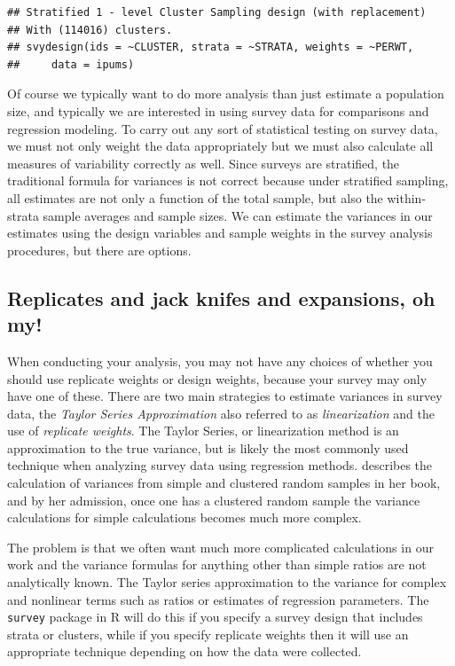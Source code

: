 \documentclass[
]{article}
\begin{document}
\begin{verbatim}
## Stratified 1 - level Cluster Sampling design (with replacement)
## With (114016) clusters.
## svydesign(ids = ~CLUSTER, strata = ~STRATA, weights = ~PERWT, 
##     data = ipums)
\end{verbatim}

Of course we typically want to do more analysis than just estimate a population size, and typically we are interested in using survey data for comparisons and regression modeling. To carry out any sort of statistical testing on survey data, we must not only weight the data appropriately but we must also calculate all measures of variability correctly as well. Since surveys are stratified, the traditional formula for variances is not correct because under stratified sampling, all estimates are not only a function of the total sample, but also the within-strata sample averages and sample sizes. We can estimate the variances in our estimates using the design variables and sample weights in the survey analysis procedures, but there are options.

\hypertarget{replicates-and-jack-knifes-and-expansions-oh-my}{%
\subsection{Replicates and jack knifes and expansions, oh my!}\label{replicates-and-jack-knifes-and-expansions-oh-my}}

When conducting your analysis, you may not have any choices of whether you should use replicate weights or design weights, because your survey may only have one of these. There are two main strategies to estimate variances in survey data, the \emph{Taylor Series Approximation} also referred to as \emph{linearization} and the use of \emph{replicate weights}. The Taylor Series, or linearization method is an approximation to the true variance, but is likely the most commonly used technique when analyzing survey data using regression methods. \citet{Lohr2019} describes the calculation of variances from simple and clustered random samples in her book, and by her admission, once one has a clustered random sample the variance calculations for simple calculations becomes much more complex.

The problem is that we often want much more complicated calculations in our work and the variance formulas for anything other than simple ratios are not analytically known. The Taylor series approximation to the variance for complex and nonlinear terms such as ratios or estimates of regression parameters. The \texttt{survey} package in R will do this if you specify a survey design that includes strata or clusters, while if you specify replicate weights then it will use an appropriate technique depending on how the data were collected.
\end{document}
